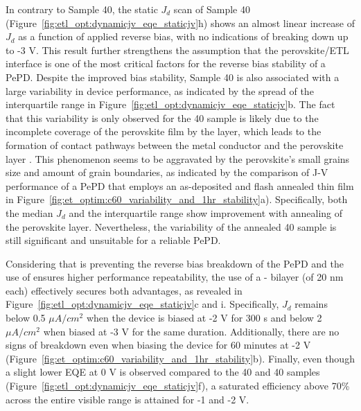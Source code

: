 In contrary to Sample 40, the static $J_d$ scan of Sample 40 (Figure~\ref{fig:etl_opt:dynamicjv_eqe_staticjv}h) shows an almost linear increase of $J_d$ as a function of applied reverse bias, with no indications of breaking down up to -3 V. This result further strengthens the assumption that the perovskite/ETL interface is one of the most critical factors for the reverse bias stability of a PePD. Despite the improved bias stability, Sample 40 is also associated with a large variability in device performance, as indicated by the spread of the interquartile range in Figure~\ref{fig:etl_opt:dynamicjv_eqe_staticjv}b. The fact that this variability is only observed for the 40 sample is likely due to the incomplete coverage of the perovskite film by the  layer, which leads to the formation of contact pathways between the metal conductor and the perovskite layer \cite{Lin2015LowImaging, Younes2021EnhancingLayer}. This phenomenon seems to be aggravated by the perovskite's small grains size and amount of grain boundaries, as indicated by the comparison of J-V performance of a PePD that employs an as-deposited and flash annealed  thin film in Figure~\ref{fig:et_optim:c60_variability_and_1hr_stability}a). Specifically, both the median $J_d$ and the interquartile range show improvement with annealing of the perovskite layer. Nevertheless, the variability of the annealed 40 sample is still significant and unsuitable for a reliable PePD. 


Considering that  is preventing the reverse bias breakdown of the PePD and the use of  ensures higher performance repeatability, the use of a - bilayer (of 20 nm each) effectively secures both advantages, as revealed in Figure~\ref{fig:etl_opt:dynamicjv_eqe_staticjv}c and i. Specifically, $J_d$ remains below 0.5 $\mu A/cm^2$ when the device is biased at -2 V for 300 s and below 2 $\mu A/cm^2$ when biased at -3 V for the same duration. Additionally, there are no signs of breakdown even when biasing the device for 60 minutes at -2 V (Figure~\ref{fig:et_optim:c60_variability_and_1hr_stability}b). Finally, even though a slight lower EQE at 0 V is observed compared to the 40 and 40 samples (Figure~\ref{fig:etl_opt:dynamicjv_eqe_staticjv}f), a saturated efficiency above 70\% across the entire visible range is attained for -1 and -2 V. 


